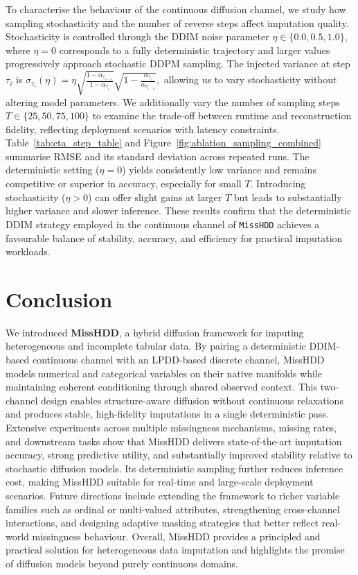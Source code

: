 \documentclass[times, review, 10pt]{elsarticle}
\begin{document}
To characterise the behaviour of the continuous diffusion channel, we study how
sampling stochasticity and the number of reverse steps affect imputation quality.
Stochasticity is controlled through the DDIM noise parameter
$\eta \in \{0.0, 0.5, 1.0\}$, where $\eta{=}0$ corresponds to a fully deterministic
trajectory and larger values progressively approach stochastic DDPM sampling.  
The injected variance at step $\tau_i$ is $
\sigma_{\tau_i}(\eta)
= \eta 
\sqrt{\frac{1 - \alpha_{\tau_{i-1}}}{1 - \alpha_{\tau_i}}}
\sqrt{1 - \frac{\alpha_{\tau_i}}{\alpha_{\tau_{i-1}}}},
$ allowing us to vary stochasticity without altering model parameters. We additionally vary the number of sampling steps $T \in \{25, 50, 75, 100\}$ to examine the trade-off between runtime and reconstruction fidelity, reflecting deployment scenarios with latency constraints. Table~\ref{tab:eta_step_table} and Figure~\ref{fig:ablation_sampling_combined}
summarise RMSE and its standard deviation across repeated runs.  The deterministic setting ($\eta{=}0$) yields consistently low variance and remains competitive or superior in accuracy, especially for small $T$.  
Introducing stochasticity ($\eta>0$) can offer slight gains at larger $T$ but leads to substantially higher variance and slower inference. These results confirm that the deterministic DDIM strategy employed in the continuous channel of \texttt{MissHDD} achieves a favourable balance of stability, accuracy, and efficiency for practical imputation workloads.

\section{Conclusion}

We introduced \textbf{MissHDD}, a hybrid diffusion framework for imputing heterogeneous and incomplete tabular data. By pairing a deterministic DDIM-based continuous channel with an LPDD-based discrete channel, MissHDD
models numerical and categorical variables on their native manifolds while maintaining coherent conditioning through shared observed context. This two-channel design enables structure-aware diffusion without continuous
relaxations and produces stable, high-fidelity imputations in a single deterministic pass. Extensive experiments across multiple missingness mechanisms, missing rates, and downstream tasks show that MissHDD delivers state-of-the-art imputation accuracy, strong predictive utility, and substantially improved stability
relative to stochastic diffusion models. Its deterministic sampling further reduces inference cost, making MissHDD suitable for real-time and large-scale deployment scenarios. Future directions include extending the framework to richer variable families such as ordinal or multi-valued attributes, strengthening cross-channel interactions, and designing adaptive masking strategies that better reflect
real-world missingness behaviour. Overall, MissHDD provides a principled and practical solution for heterogeneous data imputation and highlights the promise of diffusion models beyond purely continuous domains.
\end{document}
